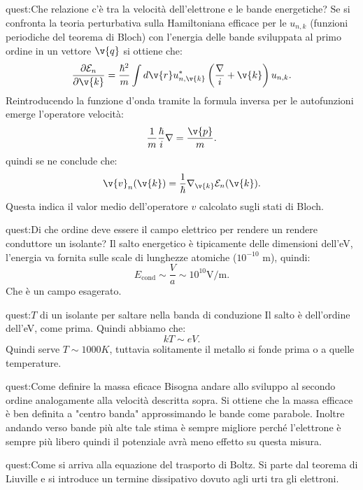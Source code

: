 \begin{quest}{quest:Che relazione c'è tra la velocità dell'elettrone e le bande energetiche?}
    Se si confronta la teoria perturbativa sulla Hamiltoniana efficace per le $u_{n,k}$ (funzioni periodiche del teorema di Bloch) con l'energia delle bande sviluppata al primo ordine in un vettore $\v{q}$ si ottiene che:
    \[
        \frac{\partial \mathcal{E}_n}{\partial \v{k}} 
	= 
	\frac{\hbar ^2}{m}
	\int d\v{r}
	u^*_{n,\v{k}}\left(\frac{\nabla }{i}+\v{k}\right)u_{n,k}
    .\] 
    Reintroducendo la funzione d'onda tramite la formula inversa per le autofunzioni emerge l'operatore velocità:
    \[
        \frac{1}{m}\frac{\hbar }{i}\nabla = \frac{\v{p}}{m}
    .\] 
    quindi se ne conclude che:
    \[
	\v{v}_n(\v{k}) 
	= 
    \frac{1}{\hbar }\nabla_{\v{k}}\mathcal{E}_n(\v{k}) 
    .\] 
    Questa indica il valor medio dell'operatore $v$ calcolato sugli stati di Bloch.
\end{quest}
\begin{quest}{quest:Di che ordine deve essere il campo elettrico per rendere un rendere conduttore un isolante?}
    Il salto energetico è tipicamente delle dimensioni dell'eV, l'energia va fornita sulle scale di lunghezze atomiche ($10^{-10}$ m), quindi:
    \[
        E_\text{cond}\sim \frac{V}{a} \sim 10^{10} \text{V/m}
    .\] 
    Che è un campo esagerato.
\end{quest}
\begin{quest}{quest:$T$ di un isolante per saltare nella banda di conduzione}
Il salto è dell'ordine dell'eV, come prima. Quindi abbiamo che:
\[
    kT \sim eV
.\] 
Quindi serve $T\sim 1000 K$, tuttavia solitamente il metallo si fonde prima o a quelle temperature.
\end{quest}
\begin{quest}{quest:Come definire la massa eficace}
Bisogna andare allo sviluppo al secondo ordine analogamente alla velocità descritta sopra. Si ottiene che la massa efficace è ben definita a "centro banda" approssimando le bande come parabole. Inoltre andando verso bande più alte tale stima è sempre migliore perché l'elettrone è sempre più libero quindi il potenziale avrà meno effetto su questa misura.
\end{quest}
\begin{quest}{quest:Come si arriva alla equazione del trasporto di Boltz.}
    Si parte dal teorema di Liuville e si introduce un termine dissipativo dovuto agli urti tra gli elettroni.
\end{quest}
